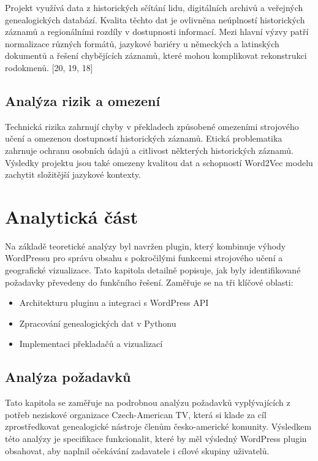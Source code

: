 \documentclass[czech, ba, kiv, he]{fasthesis}
\begin{document}
Projekt využívá data z historických sčítání lidu, digitálních archivů a veřejných genealogických databází. Kvalita těchto dat je ovlivněna neúplností historických záznamů a regionálními rozdíly v dostupnosti informací. Mezi hlavní výzvy patří normalizace různých formátů, jazykové bariéry u německých a latinských dokumentů a řešení chybějících záznamů, které mohou komplikovat rekonstrukci rodokmenů. [20, 19, 18]

\section{Analýza rizik a omezení}

Technická rizika zahrnují chyby v překladech způsobené omezeními strojového učení a omezenou dostupností historických záznamů. Etická problematika zahrnuje ochranu osobních údajů a citlivost některých historických záznamů. Výsledky projektu jsou také omezeny kvalitou dat a schopností Word2Vec modelu zachytit složitější jazykové kontexty.

\chapter{Analytická část}

Na základě teoretické analýzy byl navržen plugin, který kombinuje výhody WordPressu pro správu obsahu s pokročilými funkcemi strojového učení a geografické vizualizace. Tato kapitola detailně popisuje, jak byly identifikované požadavky převedeny do funkčního řešení. Zaměřuje se na tři klíčové oblasti:
\begin{itemize}
    \item Architekturu pluginu a integraci s WordPress API
    \item Zpracování genealogických dat v Pythonu
    \item Implementaci překladačů a vizualizací
\end{itemize}

\section{Analýza požadavků}

Tato kapitola se zaměřuje na podrobnou analýzu požadavků vyplývajících z potřeb neziskové organizace Czech-American TV, která si klade za cíl zprostředkovat genealogické nástroje členům česko-americké komunity. Výsledkem této analýzy je specifikace funkcionalit, které by měl výsledný WordPress plugin obsahovat, aby naplnil očekávání zadavatele i cílové skupiny uživatelů.
\end{document}
